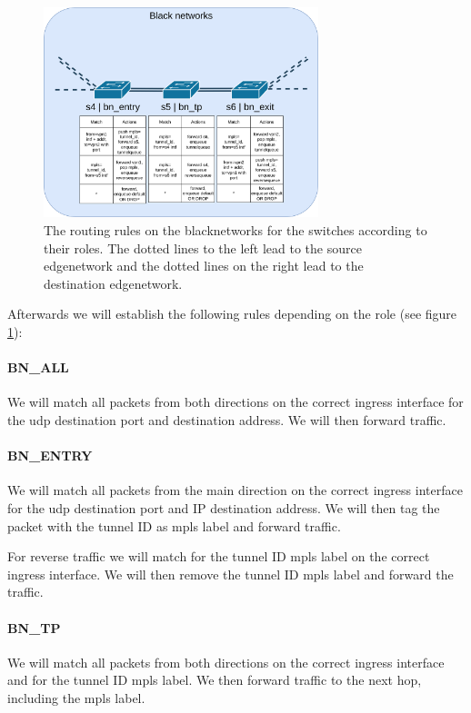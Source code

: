 \begin{figure}[ht]
    \centering
    \includegraphics[width=8cm]{images/chapter_6/routing_bn.png}
    \caption[Routing on the \gls{blacknetwork}s]{The routing rules on the \gls{blacknetwork}s for the switches according to their roles. The dotted lines to the left lead to the source \gls{edgenetwork} and the dotted lines on the right lead to the destination \gls{edgenetwork}.}
    \label{fig:routing_bn}
\end{figure}

Afterwards we will establish the following rules depending on the role (see figure \ref{fig:routing_bn}):

\paragraph{BN\_ALL} We will match all packets from both directions on the correct ingress interface for the \acrshort{udp} destination port and destination address. We will then forward traffic.

\paragraph{BN\_ENTRY} We will match all packets from the main direction on the correct ingress interface for the \acrshort{udp} destination port and IP destination address. We will then tag the packet with the tunnel ID as \acrshort{mpls} label and forward traffic.

For reverse traffic we will match for the tunnel ID \acrshort{mpls} label on the correct ingress interface. We will then remove the tunnel ID \acrshort{mpls} label and forward the traffic.

\paragraph{BN\_TP} We will match all packets from both directions on the correct ingress interface and for the tunnel ID \acrshort{mpls} label. We then forward traffic to the next hop, including the \acrshort{mpls} label.

